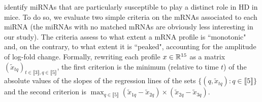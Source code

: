  identify  miRNAs that are particularly susceptible to
play a distinct role in HD in mice.  To do so, we evaluate two simple criteria
on the mRNAs  associated to each miRNA  (the miRNAs with no  matched mRNAs are
obviously less interesting in our study). The criteria assess to what extent a
mRNA  profile is  ``monotonic" and,  on  the contrary,  to what  extent it  is
``peaked",  accounting  for  the  amplitude  of  log-fold  change.   Formally,
rewriting    each     profile    $x    \in    \mathbb{R}^{15}$     as    a    matrix
$(\tilde{x}_{tq})_{t   \in   \llbracket    3\rrbracket,   q   \in   \llbracket
  5\rrbracket}$, the first criterion is the  minimum (relative to time $t$) of
the  absolute  values of  the  slopes  of the  regression  lines  of the  sets
$\{(q,  \tilde{x}_{tq})  : q  \in  \llbracket  5\rrbracket\}$ and  the  second
criterion                                                                   is
$\max_{q\in\llbracket 5  \rrbracket} (\tilde{x}_{1q} -  \tilde{x}_{2q}) \times
(\tilde{x}_{2q} -  \tilde{x}_{3q})$.  


